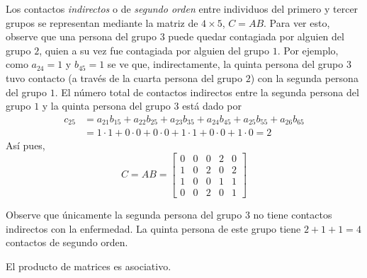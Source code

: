 \begin{example}
    Los contactos \textit{indirectos} o de \textit{segundo orden} entre individuos del primero y tercer grupos se representan mediante la matriz de $4 \times 5$, $C = AB$. Para ver esto, observe que una persona del grupo $3$ puede quedar contagiada por alguien del grupo $2$, quien a su vez fue contagiada por alguien del grupo $1$. Por ejemplo, como $a_{24} = 1$ y $b_{45} = 1$ se ve que, indirectamente, la quinta persona del grupo $3$ tuvo contacto (a través de la cuarta persona del grupo $2$) con la segunda persona del grupo $1$. El número total de contactos indirectos entre la segunda persona del grupo $1$ y la quinta persona del grupo $3$ está dado por
    \begin{align*}
        c_{25} & = a_{21}b_{15} + a_{22}b_{25} + a_{23}b_{35} + a_{24}b_{45} + a_{25}b_{55} + a_{26}b_{65} \\
        & = 1 \cdot 1 + 0 \cdot 0 + 0 \cdot 0 + 1 \cdot 1 + 0 \cdot 0 + 1 \cdot 0 = 2
    \end{align*}
    Así pues,
    $$C = AB = \begin{bmatrix}
        0 & 0 & 0 & 2 & 0 \\
        1 & 0 & 2 & 0 & 2 \\
        1 & 0 & 0 & 1 & 1 \\
        0 & 0 & 2 & 0 & 1 
    \end{bmatrix}$$

    Observe que únicamente la segunda persona del grupo $3$ no tiene contactos indirectos con la enfermedad. La quinta persona de este grupo tiene $2 + 1 + 1 = 4$ contactos de segundo orden.
\end{example}

\begin{theorem}
    El producto de matrices es asociativo.
\end{theorem}

